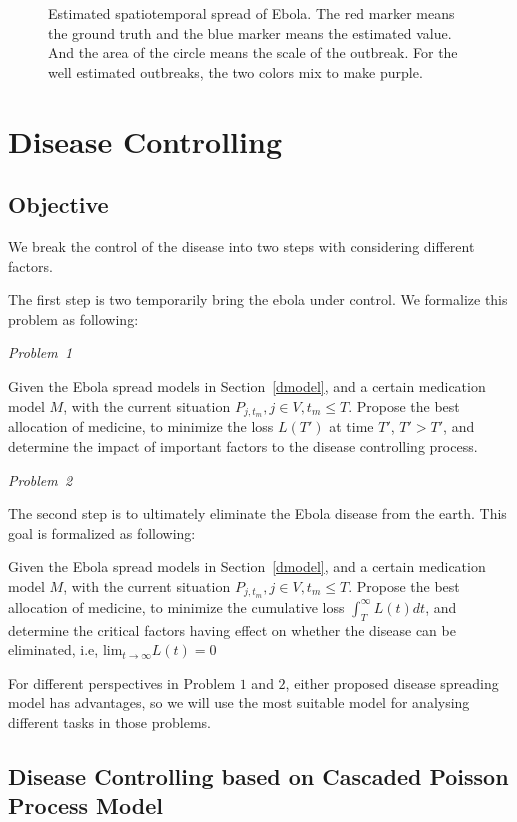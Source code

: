 \documentclass[11pt]{article}
\begin{document}
\begin{figure}
\begin{center}
  \caption{Estimated spatiotemporal spread of Ebola. The red marker means the ground truth and the blue marker means the estimated value. And the area of the circle means the scale of the outbreak. For the well estimated outbreaks, the two colors mix to make purple.}
  \label{espread}
\end{center}  
\end{figure}


\section{Disease Controlling}

\subsection{Objective}
We break the control of the disease into two steps with considering different factors. 

The first step is two temporarily bring the ebola under control. We formalize this problem as following:

\emph{Problem~1}

Given the Ebola spread models in Section~\ref{dmodel}, and a certain medication model $M$, with the current situation $P_{j,t_m}, j \in V, t_m \leq T$. Propose the best allocation of medicine, to minimize the loss $L(T')$ at time $T'$, $T' > T'$, and determine the impact of important factors to the disease controlling process.


\emph{Problem~2}

The second step is to ultimately eliminate the Ebola disease from the earth. This goal is formalized as following:

Given the Ebola spread models in Section~\ref{dmodel}, and a certain medication model $M$, with the current situation $P_{j,t_m}, j \in V, t_m \leq T$. Propose the best allocation of medicine, to minimize the cumulative loss $\int_{T}^{\infty} L(t) dt $, and determine the critical factors having effect on whether   the disease can be eliminated, i.e, $\text{lim}_{t\rightarrow \infty} L(t) = 0 $

For different perspectives in Problem $1$ and $2$, either proposed disease spreading model has advantages, so we will use the most suitable model for  analysing different tasks in those problems.


\subsection{Disease Controlling based on Cascaded Poisson Process Model}
\end{document}
